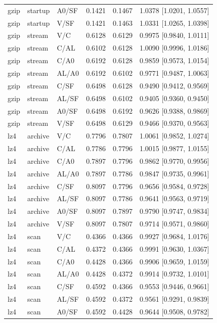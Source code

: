 \begin{longtable}{lllrrl}
gzip & startup & A0/SF & 0.1421 & 0.1467 & 1.0378 [1.0201, 1.0557] \\
gzip & startup & V/SF & 0.1421 & 0.1463 & 1.0331 [1.0265, 1.0398] \\
gzip & stream & V/C & 0.6128 & 0.6129 & 0.9975 [0.9840, 1.0111] \\
gzip & stream & C/AL & 0.6102 & 0.6128 & 1.0090 [0.9996, 1.0186] \\
gzip & stream & C/A0 & 0.6192 & 0.6128 & 0.9859 [0.9573, 1.0154] \\
gzip & stream & AL/A0 & 0.6192 & 0.6102 & 0.9771 [0.9487, 1.0063] \\
gzip & stream & C/SF & 0.6498 & 0.6128 & 0.9490 [0.9412, 0.9569] \\
gzip & stream & AL/SF & 0.6498 & 0.6102 & 0.9405 [0.9360, 0.9450] \\
gzip & stream & A0/SF & 0.6498 & 0.6192 & 0.9626 [0.9388, 0.9869] \\
gzip & stream & V/SF & 0.6498 & 0.6129 & 0.9466 [0.9370, 0.9563] \\
lz4 & archive & V/C & 0.7796 & 0.7807 & 1.0061 [0.9852, 1.0274] \\
lz4 & archive & C/AL & 0.7786 & 0.7796 & 1.0015 [0.9877, 1.0155] \\
lz4 & archive & C/A0 & 0.7897 & 0.7796 & 0.9862 [0.9770, 0.9956] \\
lz4 & archive & AL/A0 & 0.7897 & 0.7786 & 0.9847 [0.9735, 0.9961] \\
lz4 & archive & C/SF & 0.8097 & 0.7796 & 0.9656 [0.9584, 0.9728] \\
lz4 & archive & AL/SF & 0.8097 & 0.7786 & 0.9641 [0.9563, 0.9719] \\
lz4 & archive & A0/SF & 0.8097 & 0.7897 & 0.9790 [0.9747, 0.9834] \\
lz4 & archive & V/SF & 0.8097 & 0.7807 & 0.9714 [0.9571, 0.9860] \\
lz4 & scan & V/C & 0.4366 & 0.4366 & 0.9927 [0.9684, 1.0176] \\
lz4 & scan & C/AL & 0.4372 & 0.4366 & 0.9991 [0.9630, 1.0367] \\
lz4 & scan & C/A0 & 0.4428 & 0.4366 & 0.9906 [0.9659, 1.0159] \\
lz4 & scan & AL/A0 & 0.4428 & 0.4372 & 0.9914 [0.9732, 1.0101] \\
lz4 & scan & C/SF & 0.4592 & 0.4366 & 0.9553 [0.9446, 0.9661] \\
lz4 & scan & AL/SF & 0.4592 & 0.4372 & 0.9561 [0.9291, 0.9839] \\
lz4 & scan & A0/SF & 0.4592 & 0.4428 & 0.9644 [0.9508, 0.9782] \\

\end{longtable}
